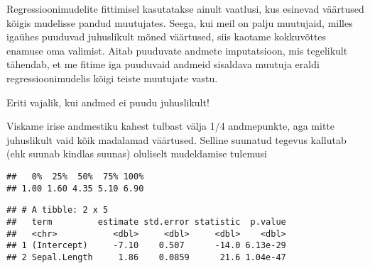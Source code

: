 \documentclass[]{article}
\newenvironment{Shaded}{\begin{snugshade}}{\end{snugshade}}
\newcommand{\KeywordTok}[1]{\textcolor[rgb]{0.13,0.29,0.53}{\textbf{#1}}}
\newcommand{\DataTypeTok}[1]{\textcolor[rgb]{0.13,0.29,0.53}{#1}}
\newcommand{\DecValTok}[1]{\textcolor[rgb]{0.00,0.00,0.81}{#1}}
\newcommand{\FloatTok}[1]{\textcolor[rgb]{0.00,0.00,0.81}{#1}}
\newcommand{\StringTok}[1]{\textcolor[rgb]{0.31,0.60,0.02}{#1}}
\newcommand{\OtherTok}[1]{\textcolor[rgb]{0.56,0.35,0.01}{#1}}
\newcommand{\OperatorTok}[1]{\textcolor[rgb]{0.81,0.36,0.00}{\textbf{#1}}}
\newcommand{\NormalTok}[1]{#1}
\begin{document}
Regressioonimudelite fittimisel kasutatakse ainult vaatlusi, kus
esinevad väärtused kõigis mudelisse pandud muutujates. Seega, kui meil
on palju muutujaid, milles igaühes puuduvad juhuslikult mõned väärtused,
siis kaotame kokkuvõttes enamuse oma valimist. Aitab puuduvate andmete
imputatsioon, mis tegelikult tähendab, et me fitime iga puuduvaid
andmeid sisaldava muutuja eraldi regressioonimudelis kõigi teiste
muutujate vastu.

Eriti vajalik, kui andmed ei puudu juhuslikult!

Viskame irise andmestiku kahest tulbast välja 1/4 andmepunkte, aga mitte
juhuslikult vaid kõik madalamad väärtused. Selline suunatud tegevus
kallutab (ehk suunab kindlas suunas) oluliselt mudeldamise tulemusi

\begin{Shaded}
\end{Shaded}

\begin{verbatim}
##   0%  25%  50%  75% 100% 
## 1.00 1.60 4.35 5.10 6.90
\end{verbatim}

\begin{Shaded}
\end{Shaded}

\begin{Shaded}
\end{Shaded}

\begin{verbatim}
## # A tibble: 2 x 5
##   term         estimate std.error statistic  p.value
##   <chr>           <dbl>     <dbl>     <dbl>    <dbl>
## 1 (Intercept)     -7.10    0.507      -14.0 6.13e-29
## 2 Sepal.Length     1.86    0.0859      21.6 1.04e-47
\end{verbatim}
\end{document}
